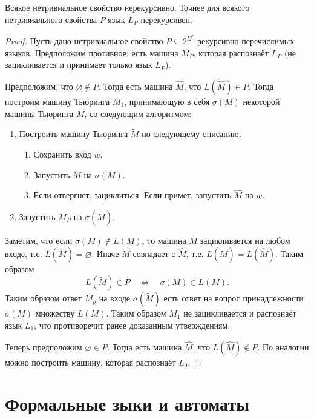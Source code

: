 \documentclass[12pt,a4paper]{article}
\begin{document}
    \begin{theorem}[Райса]
        Всякое нетривиальное свойство нерекурсивно. Точнее для всякого нетривиального свойства $P$ язык $L_P$ нерекурсивен.
    \end{theorem}

    \begin{proof}
        Пусть дано нетривиальное свойство $P \subseteq 2^{\Sigma^*}$ рекурсивно-перечислимых языков. Предположим противное: есть машина $M_P$, которая распознаёт $L_P$ (не зацикливается и принимает только язык $L_P$).

        Предположим, что $\varnothing \notin P$. Тогда есть машина $\widehat{M}$, что $L(\widehat{M}) \in P$. Тогда построим машину Тьюринга $M_1$, принимающую в себя $\sigma(M)$ некоторой машины Тьюринга $M$, со следующим алгоритмом:
        \begin{enumerate}
            \item Построить машину Тьюринга $\widetilde{M}$ по следующему описанию.
                \begin{enumerate}
                    \item Сохранить вход $w$.
                    \item Запустить $M$ на $\sigma(M)$.
                    \item Если отвергнет, зациклиться. Если примет, запустить $\widehat{M}$ на $w$.
                \end{enumerate}
            \item Запустить $M_P$ на $\sigma(\widetilde{M})$.
        \end{enumerate}
        Заметим, что если $\sigma(M) \notin L(M)$, то машина $\widetilde{M}$ зацикливается на любом входе, т.е. $L(\widetilde{M}) = \varnothing$. Иначе $\widetilde{M}$ совпадает с $\widehat{M}$, т.е. $L(\widetilde{M}) = L(\widehat{M})$. Таким образом
        \[L(\widetilde{M}) \in P \quad \Longleftrightarrow \quad \sigma(M) \in L(M).\]
        Таким образом ответ $M_p$ на входе $\sigma(\widetilde{M})$ есть ответ на вопрос принадлежности $\sigma(M)$ множеству $L(M)$. Таким образом $M_1$ не зацикливается и распознаёт язык $L_1$, что противоречит ранее доказанным утверждениям.

        Теперь предположим $\varnothing \in P$. Тогда есть машина $\widehat{M}$, что $L(\widehat{M}) \notin P$. По аналогии можно построить машину, которая распознаёт $L_0$.
    \end{proof}

    \section{Формальные зыки и автоматы}
\end{document}
